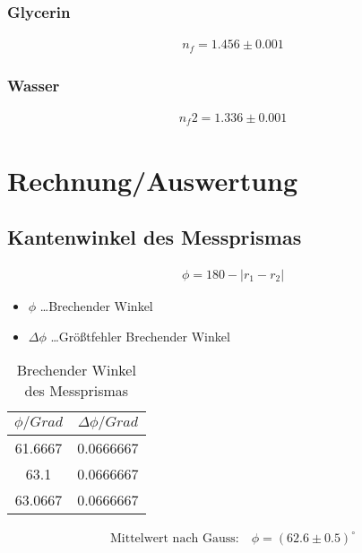 \documentclass[a4paper]{article}
\begin{document}
\subsubsection{Glycerin}
\begin{align}
  n_f=1.456\pm 0.001				
\end{align}
\subsubsection{Wasser}
\begin{align}
  n_f2=1.336\pm 0.001				
\end{align}
\newpage
\section{Rechnung/Auswertung}
\subsection{Kantenwinkel des Messprismas}
\begin{align}
  \phi = 180-\left| r_1-r_2 \right|
\end{align}
\begin{table}[ht]
  \centering
  \caption{Brechender Winkel des Messprismas}
  \begin{itemize}
    \item $\phi$ \dots Brechender Winkel
    \item $\Delta \phi$ \dots Größtfehler Brechender Winkel
  \end{itemize}
  \begin{tabular}{|c|c|}\hline
    $\phi/Grad$&$\Delta \phi/Grad$\\\hline
    61.6667 & 0.0666667 \\\hline
    63.1 & 0.0666667 \\\hline
    63.0667 & 0.0666667\\\hline
  \end{tabular}
  \label{tab:brech}
\end{table}
\begin{align}
  \text{Mittelwert nach Gauss:}\quad
  \phi = (62.6 \pm 0.5)^\circ
\end{align}
\end{document}
